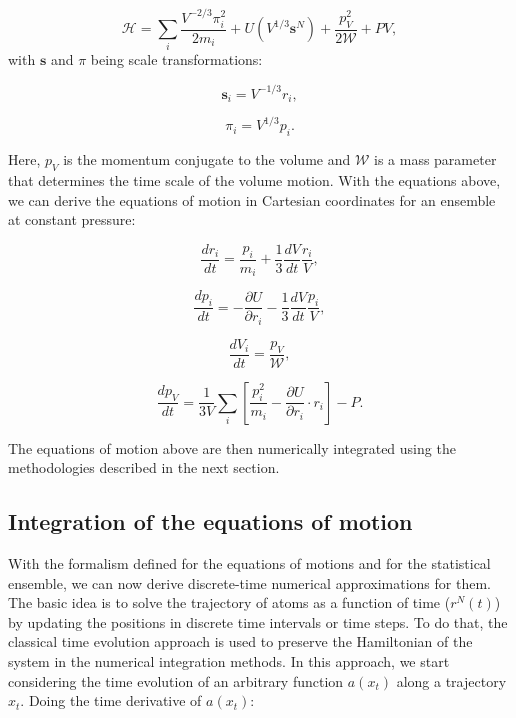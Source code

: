 \begin{equation}
\mathcal{H} =  \sum_{i} \frac{V^{-2/3} \pi _{i}^{2}}{2 m_{i}} + U(V^{1/3} \mathbf{s}^{N})  + \frac{p_{V} ^{2} }{2\mathcal{W}} + PV,
\end{equation}
with $\mathbf{s}$ and $\pi$ being scale transformations:

\begin{equation}
\mathbf{s} _{i} =  V^{-1/3} r_{i} ,
\end{equation}

\begin{equation}
\pi _{i} =  V^{1/3} p _{i}.
\end{equation}

Here, $p_{V} $ is the momentum conjugate to the volume and $\mathcal{W}$ is a mass parameter that determines the time scale of the volume motion. With the equations above, we can derive the equations of motion in Cartesian coordinates for an ensemble at constant pressure:

\begin{equation}
\frac{dr_{i}}{dt} = \frac{p_{i}}{m_{i}} + \frac{1}{3} \frac{dV}{dt} \frac{r_{i}}{V},
\end{equation}

\begin{equation}
\frac{dp_{i}}{dt} = -  \frac{\partial U}{\partial r_{i}} - \frac{1}{3} \frac{dV}{dt} \frac{p_{i}}{V},
\end{equation}

\begin{equation}
\frac{dV_{i}}{dt} = \frac{p_{V}}{\mathcal{W}},
\end{equation}

\begin{equation}
\frac{dp_{V}}{dt} = \frac{1}{3V} \sum_{i} \left [ \frac{p_{i}^{2}}{m_{i}} -  \frac{\partial U}{\partial r_{i}} \cdot r_{i} \right] -P.
\end{equation}

The equations of motion above are then numerically integrated  using the methodologies described in the next section.

\subsection{Integration of the equations of motion}

With the formalism defined for the equations of motions and for the statistical ensemble, we can now derive discrete-time numerical approximations for them.  The basic idea is to solve the trajectory of atoms as a function of time ($r^{N}(t)$) by updating the positions in discrete time intervals or time steps. To do that, the classical time evolution approach is used to preserve the Hamiltonian of the system in the numerical integration methods. In this approach, we start considering the time evolution of an arbitrary function $a(x_{t})$ along a trajectory $x_{t}$. Doing the time derivative of $a(x_{t})$:

